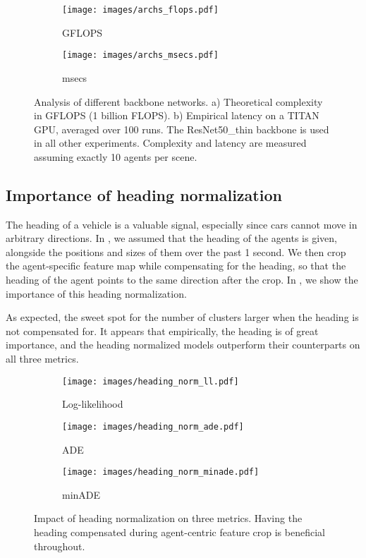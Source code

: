 \documentclass{article}
\begin{document}
\begin{figure*}[!htbp]
\centering
  \begin{subfigure}[b]{0.35\textwidth}
    \texttt{[image: images/archs\_flops.pdf]}
    \caption{GFLOPS}
    \label{fig:archs_flops}
  \end{subfigure}
  \begin{subfigure}[b]{0.35\textwidth}
    \texttt{[image: images/archs\_msecs.pdf]}
    \caption{msecs}
    \label{fig:archs_msecs}
  \end{subfigure}
\caption{Analysis of different backbone networks. a) Theoretical complexity in GFLOPS (1 billion FLOPS). b) Empirical latency on a TITAN GPU, averaged over 100 runs. The ResNet50\_thin backbone is used in all other experiments. Complexity and latency are measured assuming exactly 10 agents per scene.
}
\label{fig:archs}
\end{figure*}



\subsection{Importance of heading normalization}
\label{sec:normalizaton}


The heading of a vehicle is a valuable signal, especially since cars cannot move in arbitrary directions. In , we assumed that the heading of the agents is given, alongside the positions and sizes of them over the past 1 second. We then crop the agent-specific feature map while compensating for the heading, so that the heading of the agent points to the same direction after the crop. In , we show the importance of this heading normalization.

As expected, the sweet spot for the number of clusters  larger when the heading is not compensated for. It appears that empirically, the heading is of great importance, and the heading normalized models outperform their counterparts on all three metrics.


\begin{figure*}[!htbp]
\centering
  \begin{subfigure}[b]{0.32\textwidth}
    \texttt{[image: images/heading\_norm\_ll.pdf]}
    \caption{Log-likelihood}
    \label{fig:heading_norm_ll}
  \end{subfigure}
  \begin{subfigure}[b]{0.32\textwidth}
    \texttt{[image: images/heading\_norm\_ade.pdf]}
    \caption{ADE}
    \label{fig:heading_norm_ade}
  \end{subfigure}
  \begin{subfigure}[b]{0.32\textwidth}
    \texttt{[image: images/heading\_norm\_minade.pdf]}
    \caption{minADE}
    \label{fig:heading_norm_minade}
  \end{subfigure}  
\caption{Impact of heading normalization on three metrics. Having the heading compensated during agent-centric feature crop is beneficial throughout.
}
\label{fig:heading}
\end{figure*}
\end{document}

